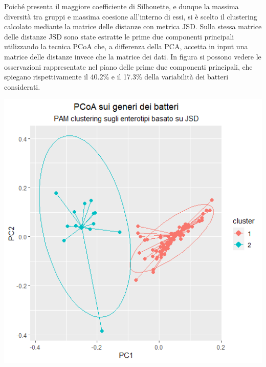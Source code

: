   
Poiché presenta il maggiore coefficiente di Silhouette, e dunque la massima diversità tra gruppi e massima coesione all’interno di essi, si è scelto il clustering calcolato mediante la matrice delle distanze con metrica JSD. 
Sulla stessa matrice delle distanze JSD sono state estratte le prime due componenti principali utilizzando la tecnica PCoA che, a differenza della PCA, accetta in input una matrice delle distanze invece che la matrice dei dati. In figura si possono vedere le osservazioni rappresentate nel piano delle prime due componenti principali, che spiegano rispettivamente il 40.2\% e il 17.3\% della variabilità dei batteri considerati.
\begin{Figure}
    \centering
    \includegraphics[width=\linewidth/2,keepaspectratio]{images/real_clustering.png}
  \end{Figure}


